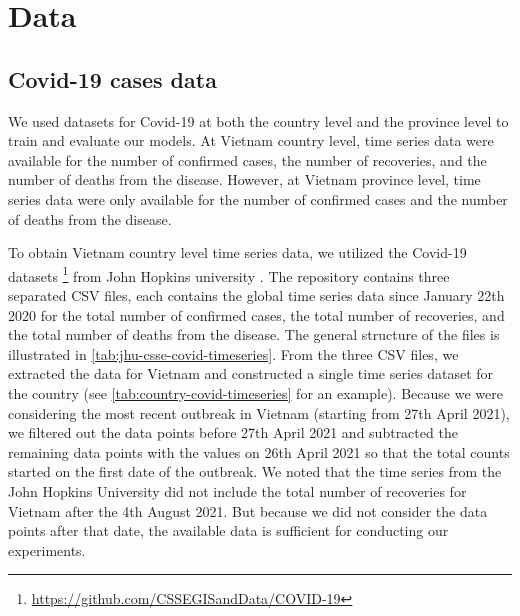 \section{Data}
\label{sec:methodologies-data}

\subsection{Covid-19 cases data}
\label{sec:methodologies-data-covid19-cases}

We used datasets for Covid-19 at both the country level and the province level to train and evaluate our models.
At Vietnam country level, time series data were available for the number of confirmed cases, the number of recoveries, and the number of deaths from the disease.
However, at Vietnam province level, time series data were only available for the number of confirmed cases and the number of deaths from the disease.

To obtain Vietnam country level time series data, we utilized the Covid-19 datasets \footnote{\url{https://github.com/CSSEGISandData/COVID-19}} from John Hopkins university \cite{dongInteractiveWebbasedDashboard2020}.
The repository contains three separated \gls{CSV} files, each contains the global time series data since January 22th 2020 for the total number of confirmed cases, the total number of recoveries, and the total number of deaths from the disease.
The general structure of the files is illustrated in \autoref{tab:jhu-csse-covid-timeseries}.
From the three \gls{CSV} files, we extracted the data for Vietnam and constructed a single time series dataset for the country (see \autoref{tab:country-covid-timeseries} for an example).
Because we were considering the most recent outbreak in Vietnam (starting from 27th April 2021), we filtered out the data points before 27th April 2021 and subtracted the remaining data points with the values on 26th April 2021 so that the total counts started on the first date of the outbreak.
We noted that the time series from the John Hopkins University did not include the total number of recoveries for Vietnam after the 4th August 2021.
But because we did not consider the data points after that date, the available data is sufficient for conducting our experiments.

